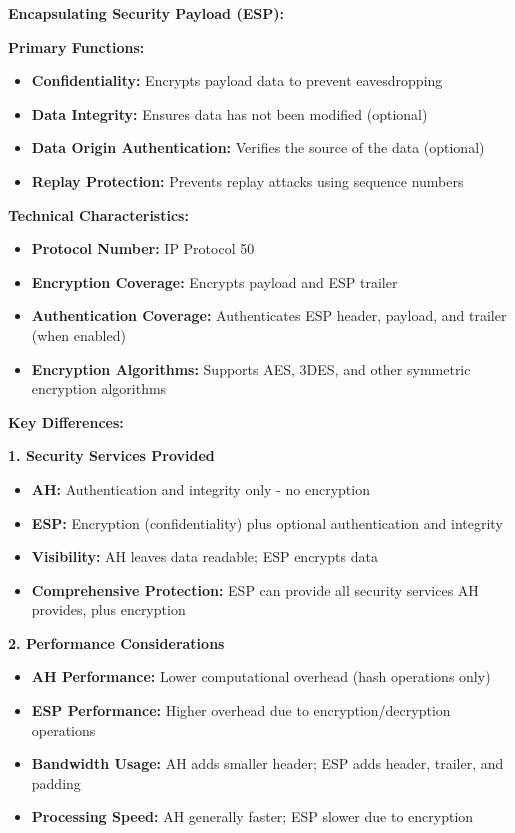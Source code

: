 \documentclass[12pt,a4paper]{article}
\begin{document}
\textbf{Encapsulating Security Payload (ESP):}

\textbf{Primary Functions:}
\begin{itemize}
    \item \textbf{Confidentiality:} Encrypts payload data to prevent eavesdropping
    \item \textbf{Data Integrity:} Ensures data has not been modified (optional)
    \item \textbf{Data Origin Authentication:} Verifies the source of the data (optional)
    \item \textbf{Replay Protection:} Prevents replay attacks using sequence numbers
\end{itemize}

\textbf{Technical Characteristics:}
\begin{itemize}
    \item \textbf{Protocol Number:} IP Protocol 50
    \item \textbf{Encryption Coverage:} Encrypts payload and ESP trailer
    \item \textbf{Authentication Coverage:} Authenticates ESP header, payload, and trailer (when enabled)
    \item \textbf{Encryption Algorithms:} Supports AES, 3DES, and other symmetric encryption algorithms
\end{itemize}

\textbf{Key Differences:}

\textbf{1. Security Services Provided}
\begin{itemize}
    \item \textbf{AH:} Authentication and integrity only - no encryption
    \item \textbf{ESP:} Encryption (confidentiality) plus optional authentication and integrity
    \item \textbf{Visibility:} AH leaves data readable; ESP encrypts data
    \item \textbf{Comprehensive Protection:} ESP can provide all security services AH provides, plus encryption
\end{itemize}

\textbf{2. Performance Considerations}
\begin{itemize}
    \item \textbf{AH Performance:} Lower computational overhead (hash operations only)
    \item \textbf{ESP Performance:} Higher overhead due to encryption/decryption operations
    \item \textbf{Bandwidth Usage:} AH adds smaller header; ESP adds header, trailer, and padding
    \item \textbf{Processing Speed:} AH generally faster; ESP slower due to encryption
\end{itemize}
\end{document}
